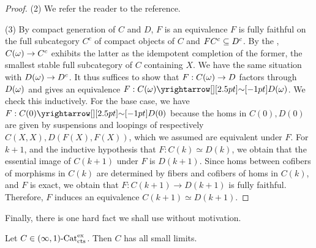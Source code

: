 \documentclass[./main.tex]{subfiles}
\begin{document}
\begin{proof}
  (2) We refer the reader to the reference.

  (3)
  By compact generation of $C$ and $D$,
  $F$ is an equivalence 
  $F$ is fully faithful on the full subcategory $C^c$ of compact objects
  of $C$ and $F C^c \subseteq D^c$.
  By the ,
  $C(\omega) \to C^c$ exhibits the latter as the idempotent completion of
  the former, the smallest stable full subcategory of $C$ containing $X$.
  We have the same situation with $D(\omega) \to D^c$.
  It thus suffices to show that $F : C(\omega) \to D$ factors through
  $D(\omega)$ and gives an equivalence $F : C(\om) \map{\sim}{} D(\om)$.
  We check this inductively.
  For the base case, we have $F : C(0) \map{\sim}{} D(0)$
  because the homs in $C(0), D(0)$ are given by suspensions and loopings
  of respectively $C(X,X) , D(F(X) , F(X))$, which we assumed are equivalent
  under $F$.
  For $k + 1$,  and
  the inductive hypothesis that $F : C(k) \simeq D(k)$,
  we obtain that the essential image of $C(k+1)$ under $F$ is $D(k+1)$.
  Since homs between cofibers of morphisms in $C(k)$ are determined by
  fibers and cofibers of homs in $C(k)$,
  and $F$ is exact,
  we obtain that $F : C(k+1) \to D(k + 1)$ is fully faithful.
  Therefore, $F$ induces an equivalence $C(k+1) \simeq D(k+1)$.

\end{proof}

Finally, there is one hard fact we shall use without motivation.
\begin{prop}
  
  Let $C \in (\infty,1)\text{-}\mathrm{Cat}^{\mathrm{ex}}_{\mathrm{cts}}$.
  Then $C$ has all small limits.
  \cite[Prop 5.5.2.4]{Lurie-HTT}
\end{prop} 
\end{document}
